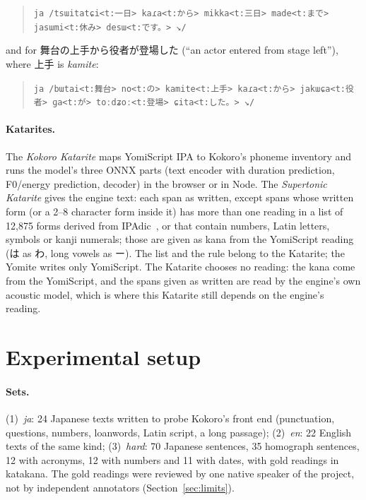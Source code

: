 \documentclass[11pt,a4paper]{article}
\newcommand{\ys}[1]{\mbox{\texttt{#1}}}
\begin{document}
\begin{quote}
\ys{ja /tsɯitatɕi<t:一日> kaɾa<t:から> mikka<t:三日> made<t:まで> jasɯmi<t:休み> desɯ<t:です。> ↘/}
\end{quote}

and for 舞台の上手から役者が登場した (``an actor entered from stage left''), where 上手 is \emph{kamite}:

\begin{quote}
\ys{ja /bɯtai<t:舞台> no<t:の> kamite<t:上手> kaɾa<t:から> jakɯɕa<t:役者> ɡa<t:が> toːdʑoː<t:登場> ɕita<t:した。> ↘/}
\end{quote}

\paragraph{Katarites.} The \emph{Kokoro Katarite} maps YomiScript IPA to Kokoro's phoneme inventory and runs the
model's three ONNX parts (text encoder with duration prediction, F0/energy prediction, decoder) in the browser or in
Node. The \emph{Supertonic Katarite} gives the engine text: each span as written, except spans whose written form (or
a 2--8 character form inside it) has more than one reading in a list of 12{,}875 forms derived from
IPAdic~\citep{ipadic}, or that contain numbers, Latin letters, symbols or kanji numerals; those are given as kana from
the YomiScript reading (は as わ, long vowels as ー). The list and the rule belong to the Katarite; the Yomite writes
only YomiScript. The Katarite chooses no reading: the kana come from the YomiScript, and the spans given as written are
read by the engine's own acoustic model, which is where this Katarite still depends on the engine's reading.

\section{Experimental setup}\label{sec:setup}

\paragraph{Sets.} (1)~\emph{ja}: 24 Japanese texts written to probe Kokoro's front end (punctuation, questions, numbers,
loanwords, Latin script, a long passage); (2)~\emph{en}: 22 English texts of the same kind; (3)~\emph{hard}: 70
Japanese sentences, 35 homograph sentences, 12 with acronyms, 12 with numbers and 11 with dates, with gold readings in
katakana. The gold readings were reviewed by one native speaker of the project, not by independent annotators
(Section~\ref{sec:limits}).
\end{document}
